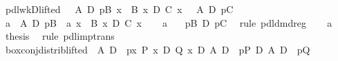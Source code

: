 \begin{isabellebody}
\isanewline
\isamarkupfalse%
\ pdl{\isacharunderscore}wkD{\isacharunderscore}lifted{}{\isacharcolon}\ {\isachardoublequote}{\isasymlbrakk}\ {\isasymturnstile}\ A\ {\isasymlongrightarrow}\isactrlsub D\ {\isasymlangle}p{\isasymrangle}B{\isacharsemicolon}\ {\isasymforall}x{\isachardot}\ {\isasymturnstile}\ B\ x\ {\isasymlongrightarrow}\isactrlsub D\ C\ x{\isasymrbrakk}\ {\isasymLongrightarrow}\ {\isasymturnstile}\ A\ {\isasymlongrightarrow}\isactrlsub D\ {\isasymlangle}p{\isasymrangle}C{\isachardoublequote}\isanewline
\isamarkupfalse%
\ {\isacharminus}\ \ \isanewline
\ \ \isamarkupfalse%
\ a{}{\isacharcolon}\ {\isachardoublequote}{\isasymturnstile}\ A\ {\isasymlongrightarrow}\isactrlsub D\ {\isasymlangle}p{\isasymrangle}B{\isachardoublequote}\ \ a{}{\isacharcolon}\ {\isachardoublequote}{\isasymforall}x{\isachardot}\ {\isasymturnstile}\ B\ x\ {\isasymlongrightarrow}\isactrlsub D\ C\ x{\isachardoublequote}\isanewline
\ \ \isamarkupfalse%
\ a{}\ \isamarkupfalse%
\ {\isachardoublequote}{\isasymturnstile}\ {\isasymlangle}p{\isasymrangle}B\ {\isasymlongrightarrow}\isactrlsub D\ {\isasymlangle}p{\isasymrangle}C{\isachardoublequote}\ \isamarkupfalse%
\ {\isacharparenleft}rule\ pdl{\isacharunderscore}dmd{\isacharunderscore}reg{\isacharparenright}\isanewline
\ \ \isamarkupfalse%
\ a{}\ \isamarkupfalse%
\ {\isacharquery}thesis\ \isamarkupfalse%
\ {\isacharparenleft}rule\ pdl{\isacharunderscore}imp{\isacharunderscore}trans{\isacharparenright}\isanewline
\isamarkupfalse%
\isanewline
\isanewline
\isamarkupfalse%
\ box{\isacharunderscore}conj{\isacharunderscore}distrib{\isacharunderscore}lifted{}{\isacharcolon}\ {\isachardoublequote}{\isasymturnstile}\ {\isacharparenleft}A\ {\isasymlongrightarrow}\isactrlsub D\ {\isacharbrackleft}{\isacharhash}\ p{\isacharbrackright}{\isacharparenleft}{\isasymlambda}x{\isachardot}\ P\ x\ {\isasymand}\isactrlsub D\ Q\ x{\isacharparenright}{\isacharparenright}\ {\isasymlongleftrightarrow}\isactrlsub D\ {\isacharparenleft}{\isacharparenleft}A\ {\isasymlongrightarrow}\isactrlsub D\ {\isacharbrackleft}{\isacharhash}\ p{\isacharbrackright}P{\isacharparenright}\ {\isasymand}\isactrlsub D\ {\isacharparenleft}A\ {\isasymlongrightarrow}\isactrlsub D\ {\isacharbrackleft}{\isacharhash}\ p{\isacharbrackright}Q{\isacharparenright}{\isacharparenright}{\isachardoublequote}\isanewline

\end{isabellebody}
